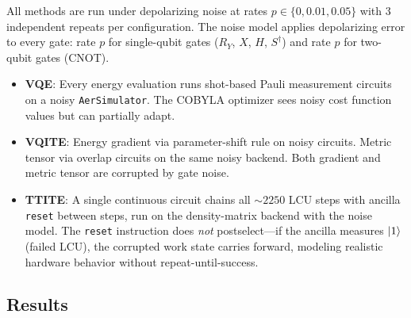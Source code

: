 \documentclass[11pt,a4paper]{article}
\begin{document}
All methods are run under depolarizing noise at rates $p \in \{0, 0.01, 0.05\}$
with 3 independent repeats per configuration. The noise model applies
depolarizing error to every gate: rate $p$ for single-qubit gates
($R_Y$, $X$, $H$, $S^\dagger$) and rate $p$ for two-qubit gates (CNOT).

\begin{itemize}[nosep]
  \item \textbf{VQE}: Every energy evaluation runs shot-based Pauli
    measurement circuits on a noisy \texttt{AerSimulator}. The COBYLA
    optimizer sees noisy cost function values but can partially adapt.
  \item \textbf{VQITE}: Energy gradient via parameter-shift rule on
    noisy circuits. Metric tensor via overlap circuits on the same noisy
    backend. Both gradient and metric tensor are corrupted by gate noise.
  \item \textbf{TTITE}: A single continuous circuit chains all
    $\sim\!2250$ LCU steps with ancilla \texttt{reset} between steps,
    run on the density-matrix backend with the noise model.
    The \texttt{reset} instruction does \emph{not} postselect---if the
    ancilla measures $\ket{1}$ (failed LCU), the corrupted work state
    carries forward, modeling realistic hardware behavior without
    repeat-until-success.
\end{itemize}

\subsection{Results}
\end{document}
